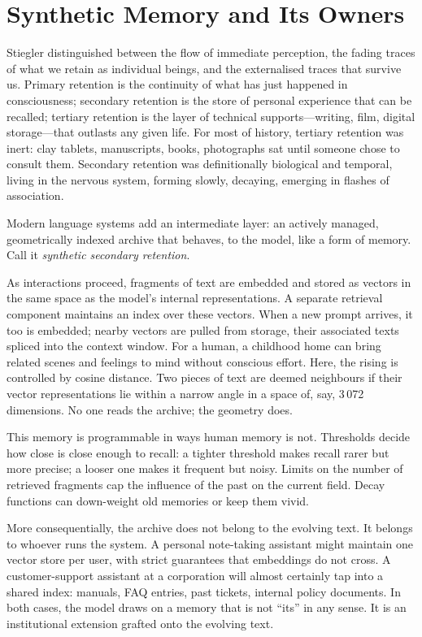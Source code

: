 \documentclass[12pt,a4paper]{report}
\begin{document}
\section{Synthetic Memory and Its Owners}

Stiegler distinguished between the flow of immediate perception, the fading traces of what we retain as individual beings, and the externalised traces that survive us.\cite{stiegler1998technics} Primary retention is the continuity of what has just happened in consciousness; secondary retention is the store of personal experience that can be recalled; tertiary retention is the layer of technical supports---writing, film, digital storage---that outlasts any given life. For most of history, tertiary retention was inert: clay tablets, manuscripts, books, photographs sat until someone chose to consult them. Secondary retention was definitionally biological and temporal, living in the nervous system, forming slowly, decaying, emerging in flashes of association.

Modern language systems add an intermediate layer: an actively managed, geometrically indexed archive that behaves, to the model, like a form of memory. Call it \emph{synthetic secondary retention}.

As interactions proceed, fragments of text are embedded and stored as vectors in the same space as the model's internal representations. A separate retrieval component maintains an index over these vectors. When a new prompt arrives, it too is embedded; nearby vectors are pulled from storage, their associated texts spliced into the context window. For a human, a childhood home can bring related scenes and feelings to mind without conscious effort. Here, the rising is controlled by cosine distance. Two pieces of text are deemed neighbours if their vector representations lie within a narrow angle in a space of, say, 3\,072 dimensions. No one reads the archive; the geometry does.

This memory is programmable in ways human memory is not. Thresholds decide how close is close enough to recall: a tighter threshold makes recall rarer but more precise; a looser one makes it frequent but noisy. Limits on the number of retrieved fragments cap the influence of the past on the current field. Decay functions can down-weight old memories or keep them vivid.

More consequentially, the archive does not belong to the evolving text. It belongs to whoever runs the system. A personal note-taking assistant might maintain one vector store per user, with strict guarantees that embeddings do not cross. A customer-support assistant at a corporation will almost certainly tap into a shared index: manuals, FAQ entries, past tickets, internal policy documents. In both cases, the model draws on a memory that is not ``its'' in any sense. It is an institutional extension grafted onto the evolving text.
\end{document}
